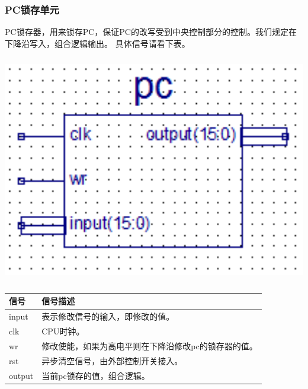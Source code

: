 \subsubsection{PC锁存单元}
    PC锁存器，用来锁存PC，保证PC的改写受到中央控制部分的控制。我们规定在下降沿写入，组合逻辑输出。
    具体信号请看下表。

\begin{center}
    \includegraphics[height=10cm]{image/detail/detail_pc.png}
    \label{fig:pc}
\end{center}
\begin{center}
    \label{table:pc}
    \begin{longtable}{p{}p{}}
        \toprule
        信号 & 信号描述 \\
        \midrule
            input & 表示修改信号的输入，即修改的值。\\
            clk & CPU时钟。\\
            wr & 修改使能，如果为高电平则在下降沿修改pc的锁存器的值。\\
            rst & 异步清空信号，由外部控制开关接入。\\
            output & 当前pc锁存的值，组合逻辑。\\
        \bottomrule
    \end{longtable}
\end{center}

